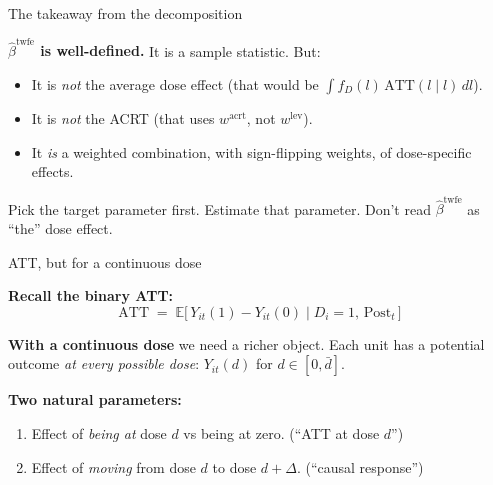 \documentclass[aspectratio=169,12pt,t]{beamer}
\begin{document}
\begin{frame}{The takeaway from the decomposition}
\vspace{0.2cm}

\textbf{$\widehat\beta^{\text{twfe}}$ is well-defined.} \;It is a sample statistic. \;But:

\vspace{0.4cm}

\begin{itemize}\small\setlength\itemsep{2pt}
  \item It is \textit{not} the average dose effect \;(that would be $\int f_D(l)\,\text{ATT}(l \mid l)\,dl$).
  \item It is \textit{not} the ACRT \;(that uses $w^{\text{acrt}}$, not $w^{\text{lev}}$).
  \item It \textit{is} a weighted combination, with sign-flipping weights, of dose-specific effects.
\end{itemize}

\vspace{0.5cm}

 \;Pick the target parameter first. \;Estimate that parameter. \;Don't read $\widehat\beta^{\text{twfe}}$ as ``the'' dose effect.

\vspace{0.4em}
\end{frame}



\begin{frame}{ATT, but for a continuous dose}
\vspace{0.2cm}

\textbf{Recall the binary ATT:}
\[
\text{ATT} \;=\; \mathbb{E}\big[\,Y_{it}(1) - Y_{it}(0) \mid D_i = 1,\,\text{Post}_t\,\big]
\]

\vspace{0.4cm}

\textbf{With a continuous dose} we need a richer object. \;Each unit has a potential outcome \textit{at every possible dose}: $Y_{it}(d)$ for $d \in [0, \bar d]$.

\vspace{0.4cm}

\textbf{Two natural parameters:}
\begin{enumerate}\small\setlength\itemsep{1pt}
  \item Effect of \textit{being at} dose $d$ vs being at zero. \;(``ATT at dose $d$'')
  \item Effect of \textit{moving} from dose $d$ to dose $d + \Delta$. \;(``causal response'')
\end{enumerate}

\vspace{0.3em}
\end{frame}
\end{document}
